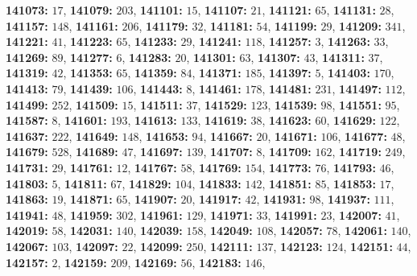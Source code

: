 \textsf{\bfseries 141073:} $17$, \textsf{\bfseries 141079:} $203$, \textsf{\bfseries 141101:} $15$, \textsf{\bfseries 141107:} $21$, \textsf{\bfseries 141121:} $65$, \textsf{\bfseries 141131:} $28$, \textsf{\bfseries 141157:} $148$, \textsf{\bfseries 141161:} $206$, \textsf{\bfseries 141179:} $32$, \textsf{\bfseries 141181:} $54$, \textsf{\bfseries 141199:} $29$, \textsf{\bfseries 141209:} $341$, \textsf{\bfseries 141221:} $41$, \textsf{\bfseries 141223:} $65$, \textsf{\bfseries 141233:} $29$, \textsf{\bfseries 141241:} $118$, \textsf{\bfseries 141257:} $3$, \textsf{\bfseries 141263:} $33$, \textsf{\bfseries 141269:} $89$, \textsf{\bfseries 141277:} $6$, \textsf{\bfseries 141283:} $20$, \textsf{\bfseries 141301:} $63$, \textsf{\bfseries 141307:} $43$, \textsf{\bfseries 141311:} $37$, \textsf{\bfseries 141319:} $42$, \textsf{\bfseries 141353:} $65$, \textsf{\bfseries 141359:} $84$, \textsf{\bfseries 141371:} $185$, \textsf{\bfseries 141397:} $5$, \textsf{\bfseries 141403:} $170$, \textsf{\bfseries 141413:} $79$, \textsf{\bfseries 141439:} $106$, \textsf{\bfseries 141443:} $8$, \textsf{\bfseries 141461:} $178$, \textsf{\bfseries 141481:} $231$, \textsf{\bfseries 141497:} $112$, \textsf{\bfseries 141499:} $252$, \textsf{\bfseries 141509:} $15$, \textsf{\bfseries 141511:} $37$, \textsf{\bfseries 141529:} $123$, \textsf{\bfseries 141539:} $98$, \textsf{\bfseries 141551:} $95$, \textsf{\bfseries 141587:} $8$, \textsf{\bfseries 141601:} $193$, \textsf{\bfseries 141613:} $133$, \textsf{\bfseries 141619:} $38$, \textsf{\bfseries 141623:} $60$, \textsf{\bfseries 141629:} $122$, \textsf{\bfseries 141637:} $222$, \textsf{\bfseries 141649:} $148$, \textsf{\bfseries 141653:} $94$, \textsf{\bfseries 141667:} $20$, \textsf{\bfseries 141671:} $106$, \textsf{\bfseries 141677:} $48$, \textsf{\bfseries 141679:} $528$, \textsf{\bfseries 141689:} $47$, \textsf{\bfseries 141697:} $139$, \textsf{\bfseries 141707:} $8$, \textsf{\bfseries 141709:} $162$, \textsf{\bfseries 141719:} $249$, \textsf{\bfseries 141731:} $29$, \textsf{\bfseries 141761:} $12$, \textsf{\bfseries 141767:} $58$, \textsf{\bfseries 141769:} $154$, \textsf{\bfseries 141773:} $76$, \textsf{\bfseries 141793:} $46$, \textsf{\bfseries 141803:} $5$, \textsf{\bfseries 141811:} $67$, \textsf{\bfseries 141829:} $104$, \textsf{\bfseries 141833:} $142$, \textsf{\bfseries 141851:} $85$, \textsf{\bfseries 141853:} $17$, \textsf{\bfseries 141863:} $19$, \textsf{\bfseries 141871:} $65$, \textsf{\bfseries 141907:} $20$, \textsf{\bfseries 141917:} $42$, \textsf{\bfseries 141931:} $98$, \textsf{\bfseries 141937:} $111$, \textsf{\bfseries 141941:} $48$, \textsf{\bfseries 141959:} $302$, \textsf{\bfseries 141961:} $129$, \textsf{\bfseries 141971:} $33$, \textsf{\bfseries 141991:} $23$, \textsf{\bfseries 142007:} $41$, \textsf{\bfseries 142019:} $58$, \textsf{\bfseries 142031:} $140$, \textsf{\bfseries 142039:} $158$, \textsf{\bfseries 142049:} $108$, \textsf{\bfseries 142057:} $78$, \textsf{\bfseries 142061:} $140$, \textsf{\bfseries 142067:} $103$, \textsf{\bfseries 142097:} $22$, \textsf{\bfseries 142099:} $250$, \textsf{\bfseries 142111:} $137$, \textsf{\bfseries 142123:} $124$, \textsf{\bfseries 142151:} $44$, \textsf{\bfseries 142157:} $2$, \textsf{\bfseries 142159:} $209$, \textsf{\bfseries 142169:} $56$, \textsf{\bfseries 142183:} $146$, 
